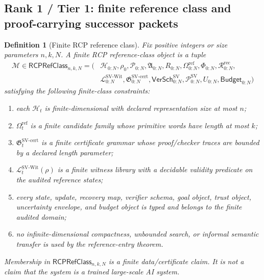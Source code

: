\documentclass[11pt]{article}
\newtheorem{definition}[theorem]{Definition}
\newcommand{\Hcal}{\mathcal{H}}
\newcommand{\Pcal}{\mathcal{P}}
\newcommand{\Lcal}{\mathcal{L}}
\newcommand{\1}{\mathbf{1}}
\providecommand{\rec}{\mathrm{rec}}
\begin{document}
\subsection{Rank 1 / Tier 1: finite reference class and proof-carrying successor packets}

\begin{definition}[Finite RCP reference class]
\label{def:batch13r_rcp_ref_class}
Fix positive integers or size parameters \(n,k,N\).  A finite RCP reference-class object is a tuple
\[
\begin{aligned}
\mathcal M\in\mathsf{RCPRefClass}_{n,k,N}
=(&\Hcal_{0:N},\rho_0,\Pcal_{0:N},\mathfrak A_{0:N},R_{0:N},
\Omega_{0:N}^{\mathrm{ref}},\Phi_{0:N},\mathcal R_{0:N}^{\rec},\\
&\Lcal_{0:N}^{\mathrm{SV\mbox{-}Wit}},
\mathfrak G_{0:N}^{\mathrm{SV\mbox{-}cert}},
\mathsf{VerSch}_{0:N}^{\mathrm{SV}},
\Pcal_{0:N}^{\mathrm{SV}},U_{0:N},
\mathsf{Budget}_{0:N})
\end{aligned}
\]
satisfying the following finite-class constraints:
\begin{enumerate}[label=(\roman*),leftmargin=1.5em]
    \item each \(\Hcal_t\) is finite-dimensional with declared representation size at most \(n\);
    \item \(\Omega_t^{\mathrm{ref}}\) is a finite candidate family whose primitive words have length at most \(k\);
    \item \(\mathfrak G_t^{\mathrm{SV\mbox{-}cert}}\) is a finite certificate grammar whose proof/checker traces are bounded by a declared length parameter;
    \item \(\Lcal_t^{\mathrm{SV\mbox{-}Wit}}(\rho)\) is a finite witness library with a decidable validity predicate on the audited reference states;
    \item every state, update, recovery map, verifier schema, goal object, trust object, uncertainty envelope, and budget object is typed and belongs to the finite audited domain;
    \item no infinite-dimensional compactness, unbounded search, or informal semantic transfer is used by the reference-entry theorem.
\end{enumerate}
Membership in \(\mathsf{RCPRefClass}_{n,k,N}\) is a finite data/certificate claim.  It is not a claim that the system is a trained large-scale AI system.
\end{definition}
\end{document}
